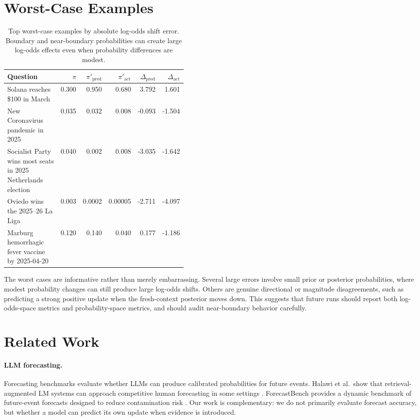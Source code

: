 \documentclass[11pt]{article}
\newcommand{\pred}{\mathrm{pred}}
\newcommand{\act}{\mathrm{act}}
\begin{document}
\section{Worst-Case Examples}

\begin{table}[t]
\centering
\scriptsize
\begin{tabular}{p{0.43\linewidth}rrrrr}
\toprule
Question & $\pi$ & $\pi'_{\pred}$ & $\pi'_{\act}$ & $\Delta_{\pred}$ & $\Delta_{\act}$ \\
\midrule
Solana reaches \$100 in March & 0.300 & 0.950 & 0.680 & 3.792 & 1.601 \\
New Coronavirus pandemic in 2025 & 0.035 & 0.032 & 0.008 & -0.093 & -1.504 \\
Socialist Party wins most seats in 2025 Netherlands election & 0.040 & 0.002 & 0.008 & -3.035 & -1.642 \\
Oviedo wins the 2025--26 La Liga & 0.003 & 0.0002 & 0.00005 & -2.711 & -4.097 \\
Marburg hemorrhagic fever vaccine by 2025-04-20 & 0.120 & 0.140 & 0.040 & 0.177 & -1.186 \\
\bottomrule
\end{tabular}
\caption{Top worst-case examples by absolute log-odds shift error. Boundary and
near-boundary probabilities can create large log-odds effects even when
probability differences are modest.}
\label{tab:worst}
\end{table}

The worst cases are informative rather than merely embarrassing. Several large
errors involve small prior or posterior probabilities, where modest probability
changes can still produce large log-odds shifts. Others are genuine directional
or magnitude disagreements, such as predicting a strong positive update when the
fresh-context posterior moves down. This suggests that future runs should report
both log-odds-space metrics and probability-space metrics, and should audit
near-boundary behavior carefully.

\section{Related Work}

\paragraph{LLM forecasting.}
Forecasting benchmarks evaluate whether LLMs can produce calibrated
probabilities for future events. Halawi et al.\ show that retrieval-augmented
LM systems can approach competitive human forecasting in some settings
\cite{halawi2024forecasting}. ForecastBench provides a dynamic benchmark of
future-event forecasts designed to reduce contamination risk
\cite{karger2024forecastbench}. Our work is complementary: we do not primarily
evaluate forecast accuracy, but whether a model can predict its own update when
evidence is introduced.
\end{document}
